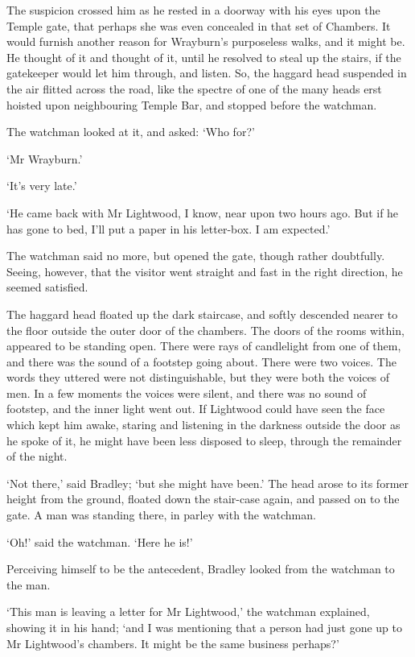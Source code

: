 The suspicion crossed him as he rested in a doorway with his eyes upon
the Temple gate, that perhaps she was even concealed in that set of
Chambers. It would furnish another reason for Wrayburn’s purposeless
walks, and it might be. He thought of it and thought of it, until
he resolved to steal up the stairs, if the gatekeeper would let him
through, and listen. So, the haggard head suspended in the air flitted
across the road, like the spectre of one of the many heads erst hoisted
upon neighbouring Temple Bar, and stopped before the watchman.

The watchman looked at it, and asked: ‘Who for?’

‘Mr Wrayburn.’

‘It’s very late.’

‘He came back with Mr Lightwood, I know, near upon two hours ago. But if
he has gone to bed, I’ll put a paper in his letter-box. I am expected.’

The watchman said no more, but opened the gate, though rather
doubtfully. Seeing, however, that the visitor went straight and fast in
the right direction, he seemed satisfied.

The haggard head floated up the dark staircase, and softly descended
nearer to the floor outside the outer door of the chambers. The doors
of the rooms within, appeared to be standing open. There were rays of
candlelight from one of them, and there was the sound of a footstep
going about. There were two voices. The words they uttered were not
distinguishable, but they were both the voices of men. In a few moments
the voices were silent, and there was no sound of footstep, and the
inner light went out. If Lightwood could have seen the face which kept
him awake, staring and listening in the darkness outside the door as
he spoke of it, he might have been less disposed to sleep, through the
remainder of the night.

‘Not there,’ said Bradley; ‘but she might have been.’ The head arose to
its former height from the ground, floated down the stair-case again,
and passed on to the gate. A man was standing there, in parley with the
watchman.

‘Oh!’ said the watchman. ‘Here he is!’

Perceiving himself to be the antecedent, Bradley looked from the
watchman to the man.

‘This man is leaving a letter for Mr Lightwood,’ the watchman explained,
showing it in his hand; ‘and I was mentioning that a person had just
gone up to Mr Lightwood’s chambers. It might be the same business
perhaps?’

